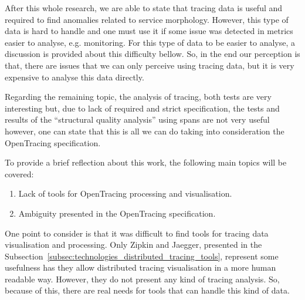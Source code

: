 
After this whole research, we are able to state that tracing data is useful and required to find anomalies related to service morphology. However, this type of data is hard to handle and one must use it if some issue was detected in metrics easier to analyse, e.g. monitoring. For this type of data to be easier to analyse, a discussion is provided about this difficulty bellow. So, in the end our perception is that, there are issues that we can only perceive using tracing data, but it is very expensive to analyse this data directly.

Regarding the remaining topic, the analysis of tracing, both tests are very interesting but, due to lack of required and strict specification, the tests and results of the ``structural quality analysis'' using spans are not very useful however, one can state that this is all we can do taking into consideration the OpenTracing specification.


To provide a brief reflection about this work, the following main topics will be covered:

\begin{enumerate}
    \item Lack of tools for OpenTracing processing and visualisation.
    \item Ambiguity presented in the OpenTracing specification.
\end{enumerate}

One point to consider is that it was difficult to find tools for tracing data visualisation and processing. Only Zipkin and Jaegger, presented in the Subsection~\ref{subsec:technologies_distributed_tracing_tools}, represent some usefulness has they allow distributed tracing visualisation in a more human readable way. However, they do not present any kind of tracing analysis. So, because of this, there are real needs for tools that can handle this kind of data.

